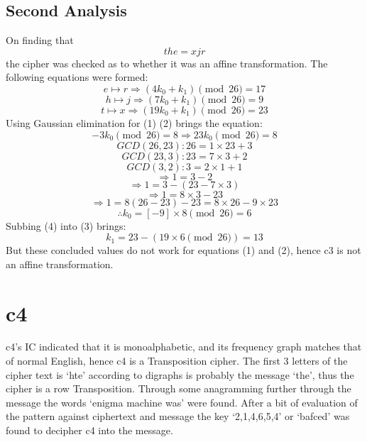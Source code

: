 \documentclass{article}
\begin{document}
      \subsection{Second Analysis}
      On finding that \[ the = xjr \] the cipher was checked as to whether it was an affine transformation. The 
      following equations were formed:
      \begin{equation}
        e \mapsto r \Rightarrow (4 k_0 + k_1) \pmod{26} = 17
      \end{equation}
      \begin{equation}
        h \mapsto j \Rightarrow (7 k_0 + k_1) \pmod{26} = 9
      \end{equation}
      \begin{equation}
        t \mapsto x \Rightarrow (19 k_0 + k_1) \pmod{26} = 23
       \end{equation}
       Using Gaussian elimination for (1) \- (2) brings the equation:
       \begin{equation}
         -3 k_0 \pmod{26} = 8 \Rightarrow 23 k_0 \pmod{26} = 8
       \end{equation}
       \[ GCD(26,23): 26 = 1 \times 23 + 3 \]
       \[ GCD(23,3):  23 = 7 \times 3 + 2 \] 
       \[ GCD(3,2): 3 = 2 \times 1 + 1 \] 
       \[ \Rightarrow 1 = 3 - 2 \] 
       \[ \Rightarrow 1 = 3 - (23 - 7 \times 3) \] 
       \[ \Rightarrow 1 = 8 \times 3 - 23 \] 
       \[ \Rightarrow 1 = 8(26 - 23) - 23 = 8 \times 26 - 9 \times 23 \]
       \begin{equation}
         \therefore k_0 = [-9] \times 8 \pmod{26} = 6
       \end{equation}
       Subbing (4) into (3) brings:
       \begin{equation}
         k_1 = 23 - (19 \times 6 \pmod{26}) = 13
       \end{equation}
       But these concluded values do not work for equations (1) and (2), hence c3 is not an affine transformation.
      \section{c4}
      c4's IC indicated that it is monoalphabetic, and its frequency graph matches that
      of normal English, hence c4 is a Transposition cipher. The first 3 letters of the
      cipher text is `hte' according to digraphs is probably the message `the', thus the
      cipher is a row Transposition. Through some anagramming further through the message 
      the words `enigma machine was' were found. After a bit of evaluation of the pattern 
      against ciphertext and message the key `2,1,4,6,5,4' or `bafced' was found to decipher 
      c4 into the message. \\
\end{document}
